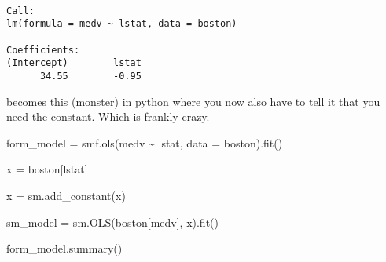 \documentclass[
  letterpaper,
  DIV=11,
  numbers=noendperiod]{scrreprt}
\newenvironment{Shaded}{\begin{snugshade}}{\end{snugshade}}
\newcommand{\NormalTok}[1]{\textcolor[rgb]{0.00,0.23,0.31}{#1}}
\newcommand{\OperatorTok}[1]{\textcolor[rgb]{0.37,0.37,0.37}{#1}}
\newcommand{\StringTok}[1]{\textcolor[rgb]{0.13,0.47,0.30}{#1}}
\begin{document}
\begin{verbatim}

Call:
lm(formula = medv ~ lstat, data = boston)

Coefficients:
(Intercept)        lstat  
      34.55        -0.95  
\end{verbatim}

becomes this (monster) in python where you now also have to tell it that
you need the constant. Which is frankly crazy.

\begin{Shaded}
\begin{Highlighting}[]
\NormalTok{form\_model }\OperatorTok{=}\NormalTok{ smf.ols(}\StringTok{\textquotesingle{}medv \textasciitilde{} lstat\textquotesingle{}}\NormalTok{, data }\OperatorTok{=}\NormalTok{ boston).fit()}

\NormalTok{x }\OperatorTok{=}\NormalTok{ boston[}\StringTok{\textquotesingle{}lstat\textquotesingle{}}\NormalTok{]}

\NormalTok{x }\OperatorTok{=}\NormalTok{ sm.add\_constant(x)}

\NormalTok{sm\_model }\OperatorTok{=}\NormalTok{ sm.OLS(boston[}\StringTok{\textquotesingle{}medv\textquotesingle{}}\NormalTok{], x).fit()}

\NormalTok{form\_model.summary()}
\end{Highlighting}
\end{Shaded}
\end{document}
